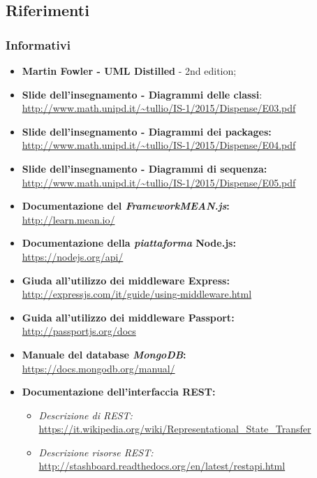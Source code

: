 \subsection{Riferimenti}
\subsubsection{Informativi}
\begin{itemize}
	\item \textbf{Martin Fowler - UML Distilled} - 2nd edition;
	\item \textbf{Slide dell'insegnamento - Diagrammi delle classi}: \\
	\url{http://www.math.unipd.it/~tullio/IS-1/2015/Dispense/E03.pdf}
	\item \textbf{Slide dell'insegnamento - Diagrammi dei packages:} \\
	\url{http://www.math.unipd.it/~tullio/IS-1/2015/Dispense/E04.pdf}
	\item \textbf{Slide dell'insegnamento - Diagrammi di sequenza:} \\
	\url{http://www.math.unipd.it/~tullio/IS-1/2015/Dispense/E05.pdf}
	\item \textbf{Documentazione del \textit{FrameworkMEAN.js}:} \\
	\url{http://learn.mean.io/}
	\item \textbf{Documentazione della \textit{piattaforma} Node.js:} \\
	\url{https://nodejs.org/api/}
	\item \textbf{Giuda all'utilizzo dei middleware Express:} \\
	\url{http://expressjs.com/it/guide/using-middleware.html}
	\item \textbf{Guida all'utilizzo dei middleware Passport:} \\
	\url{http://passportjs.org/docs}
	\item \textbf{Manuale del database \textit{MongoDB}:} \\
	\url{https://docs.mongodb.org/manual/}
	\item \textbf{Documentazione dell'interfaccia REST:}
	\begin{itemize}
		\item \textit{Descrizione di REST:} \url{https://it.wikipedia.org/wiki/Representational_State_Transfer}
		\item \textit{Descrizione risorse REST:} \url{http://stashboard.readthedocs.org/en/latest/restapi.html}
	\end{itemize}

\end{itemize}
